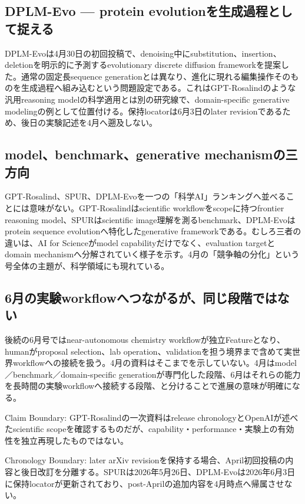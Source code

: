 \subsection{DPLM-Evo — protein evolutionを生成過程として捉える}

DPLM-Evoは4月30日の初回投稿で、denoising中にsubstitution、insertion、deletionを明示的に予測するevolutionary discrete diffusion frameworkを提案した。通常の固定長sequence generationとは異なり、進化に現れる編集操作そのものを生成過程へ組み込むという問題設定である。これはGPT-Rosalindのような汎用reasoning modelの科学適用とは別の研究線で、domain-specific generative modelingの例として位置付ける。保持locatorは6月3日のlater revisionであるため、後日の実験記述を4月へ遡及しない。\autocite{src-f0bb84fcd319}


\subsection{model、benchmark、generative mechanismの三方向}

GPT-Rosalind、SPUR、DPLM-Evoを一つの「科学AI」ランキングへ並べることには意味がない。GPT-Rosalindはscientific workflowをscopeに持つfrontier reasoning model、SPURはscientific image理解を測るbenchmark、DPLM-Evoはprotein sequence evolutionへ特化したgenerative frameworkである。むしろ三者の違いは、AI for Scienceがmodel capabilityだけでなく、evaluation targetとdomain mechanismへ分解されていく様子を示す。4月の「競争軸の分化」という号全体の主題が、科学領域にも現れている。\autocite{src-078f0d540d88,src-7ae707d75c4b,src-f0bb84fcd319}


\subsection{6月の実験workflowへつながるが、同じ段階ではない}

後続の6月号ではnear-autonomous chemistry workflowが独立Featureとなり、humanがproposal selection、lab operation、validationを担う境界まで含めて実世界workflowへの接続を扱う。4月の資料はそこまでを示していない。4月はmodel／benchmark／domain-specific generationが専門化した段階、6月はそれらの能力を長時間の実験workflowへ接続する段階、と分けることで進展の意味が明確になる。\autocite{src-078f0d540d88,src-7ae707d75c4b,src-f0bb84fcd319}


\begin{claimboundary}
Claim Boundary: GPT-Rosalindの一次資料はrelease chronologyとOpenAIが述べたscientific scopeを確認するものだが、capability・performance・実験上の有効性を独立再現したものではない。\autocite{src-078f0d540d88}
\end{claimboundary}

\begin{claimboundary}
Chronology Boundary: later arXiv revisionを保持する場合、April初回投稿の内容と後日改訂を分離する。SPURは2026年5月26日、DPLM-Evoは2026年6月3日に保持locatorが更新されており、post-Aprilの追加内容を4月時点へ帰属させない。\autocite{src-7ae707d75c4b,src-f0bb84fcd319}
\end{claimboundary}
